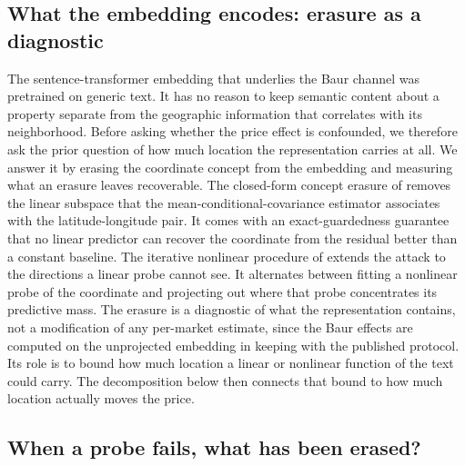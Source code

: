 \subsection{What the embedding encodes: erasure as a diagnostic}

The sentence-transformer embedding that underlies the Baur channel was pretrained
on generic text. It has no reason to keep semantic content about a property
separate from the geographic information that correlates with its neighborhood.
Before asking whether the price effect is confounded, we therefore ask the prior
question of how much location the representation carries at all. We answer it by
erasing the coordinate concept from the embedding and measuring what an erasure
leaves recoverable. The closed-form concept erasure of \citet{belrose2023leace}
removes the linear subspace that the mean-conditional-covariance estimator
associates with the latitude-longitude pair. It comes with an exact-guardedness
guarantee that no linear predictor can recover the coordinate from the residual
better than a constant baseline. The iterative nonlinear procedure of
\citet{iskander2023shielded} extends the attack to the directions a linear probe
cannot see. It alternates between fitting a nonlinear probe of the coordinate and
projecting out where that probe concentrates its predictive mass. The erasure is a
diagnostic of what the representation contains, not a modification of any
per-market estimate, since the Baur effects are computed on the unprojected
embedding in keeping with the published protocol. Its role is to bound how much
location a linear or nonlinear function of the text could carry. The
decomposition below then connects that bound to how much location actually moves
the price.

\subsection{When a probe fails, what has been erased?}
\label{sec:frozen_probe_theory}

